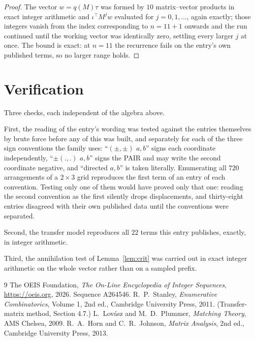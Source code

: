 \documentclass[11pt,a4paper]{article}
\theoremstyle{plain}
\theoremstyle{definition}
\begin{document}
\begin{proof}
The vector $w=q(M)\tau$ was formed by $10$ matrix--vector products in exact integer
arithmetic and $\iota^{\!\top}M^{j}w$ evaluated for $j=0,1,\dots$, again exactly; those
integers vanish from the index corresponding to $n=11+1$ onwards and the run continued
until the working vector was identically zero, settling every larger $j$ at once. The bound is exact: at $n=11$ the recurrence fails on the entry's own published terms, so no larger range holds.
\end{proof}

\section{Verification}

Three checks, each independent of the algebra above.

First, the reading of the entry's wording was tested against the entries themselves by brute
force before any of this was built, and separately for each of the three sign conventions the
family uses: ``$(\pm,\pm)$ $a,b$'' signs each coordinate independently, ``$\pm(.,.)$ $a,b$''
signs the PAIR and may write the second coordinate negative, and ``directed $a,b$'' is taken
literally. Enumerating all $720$ arrangements of a $2\times3$ grid reproduces the first term
of an entry of each convention. Testing only one of them would have proved only that one:
reading the second convention as the first silently drops displacements, and thirty-eight
entries disagreed with their own published data until the conventions were separated.

Second, the transfer model reproduces all $22$ terms this entry publishes, exactly, in
integer arithmetic.

Third, the annihilation test of Lemma~\ref{lem:crit} was carried out in exact integer
arithmetic on the whole vector rather than on a sampled prefix.

\begin{thebibliography}{9}
 The OEIS Foundation, \emph{The On-Line Encyclopedia of Integer
Sequences}, \url{https://oeis.org}, 2026. Sequence A264546.
 R.~P.~Stanley, \emph{Enumerative Combinatorics}, Volume 1, 2nd ed.,
Cambridge University Press, 2011. (Transfer-matrix method, Section 4.7.)
 L.~Lov\'asz and M.~D.~Plummer, \emph{Matching Theory}, AMS Chelsea, 2009.
 R.~A.~Horn and C.~R.~Johnson, \emph{Matrix Analysis}, 2nd ed., Cambridge
University Press, 2013.
\end{thebibliography}
\end{document}
